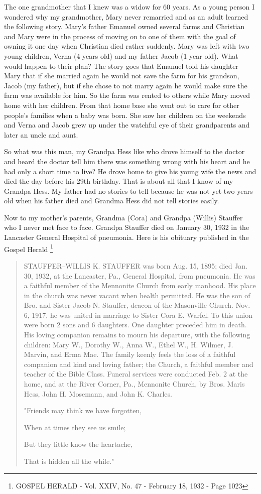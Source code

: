 The one grandmother that I knew was a widow for 60 years.
As a young person I wondered why my grandmother, Mary never remarried and as an adult learned the following story.
Mary's father Emanuel owned several farms and Christian and Mary were in the process of moving on to one of them with the goal of owning it one day when Christian died rather suddenly.
Mary was left with two young children, Verna (4 years old) and my father Jacob (1 year old).
What would happen to their plan? The story goes that Emanuel told his daughter Mary that if she married again he would not save the farm for his grandson, Jacob (my father), but if she chose to not marry again he would make sure the farm was available for him.
So the farm was rented to others while Mary moved home with her children.
From that home base she went out to care for other people's families when a baby was born.
She saw her children on the weekends and Verna and Jacob grew up under the watchful eye of their grandparents and later an uncle and aunt.


So what was this man, my Grandpa Hess like who drove himself to the doctor and heard the doctor tell him there was something wrong with his heart and he had only a short time to live? He drove home to give his young wife the news and died the day before his 29th birthday.
That is about all that I know of my Grandpa Hess.
My father had no stories to tell because he was not yet two years old when his father died and Grandma Hess did not tell stories easily.

Now to my mother's parents, Grandma (Cora) and Grandpa (Willis) Stauffer who I never met face to face. Grandpa Stauffer died on January 30, 1932 in the Lancaster General Hospital of pneumonia. Here is his obituary published in the Gospel Herald \footnote{GOSPEL HERALD - Vol. XXIV, No. 47 - February 18, 1932 - Page 1023}
\begin{quotation}
STAUFFER--WILLIS K. STAUFFER was born Aug. 15, 1895; died Jan. 30, 1932, at the Lancaster, Pa., General Hospital, from pneumonia. He was a faithful member of the Mennonite Church from early manhood. His place in the church was never vacant when health permitted. He was the son of Bro. and Sister Jacob N. Stauffer, deacon of the Masonville Church. Nov. 6, 1917, he was united in marriage to Sister Cora E. Warfel. To this union were born 2 sons and 6 daughters. One daughter preceded him in death. His loving companion remains to mourn his departure, with the following children: Mary W., Dorothy W., Anna W., Ethel W., H. Wilmer, J. Marvin, and Erma Mae. The family keenly feels the loss of a faithful companion and kind and loving father; the Church, a faithful member and teacher of the Bible Class. Funeral services were conducted Feb. 2 at the home, and at the River Corner, Pa., Mennonite Church, by Bros. Maris Hess, John H. Mosemann, and John K. Charles.

"Friends may think we have forgotten,

When at times they see us smile;

But they little know the heartache,

That is hidden all the while."
\end{quotation}

